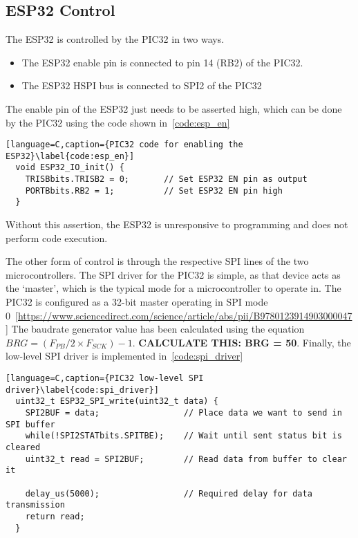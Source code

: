\subsection{ESP32 Control}
The ESP32 is controlled by the PIC32 in two ways.

\begin{itemize}
        \item The ESP32 enable pin is connected to pin 14 (RB2) of the PIC32.
        \item The ESP32 HSPI bus is connected to SPI2 of the PIC32
\end{itemize}

The enable pin of the ESP32 just needs to be asserted high, which can be done by the PIC32 using the code shown in~\autoref{code:esp_en}

\begin{lstlisting}[language=C,caption={PIC32 code for enabling the ESP32}\label{code:esp_en}]
  void ESP32_IO_init() {
    TRISBbits.TRISB2 = 0;       // Set ESP32 EN pin as output
    PORTBbits.RB2 = 1;          // Set ESP32 EN pin high
  }
\end{lstlisting}

Without this assertion, the ESP32 is unresponsive to programming and does not perform code execution.

The other form of control is through the respective SPI lines of the two microcontrollers.
The SPI driver for the PIC32 is simple, as that device acts as the `master', which is the typical mode for a microcontroller to operate in.
The PIC32 is configured as a 32-bit master operating in SPI mode 0~\ref{https://www.sciencedirect.com/science/article/abs/pii/B9780123914903000047}
The baudrate generator value has been calculated using the equation \(BRG = (F_{PB} / 2 \times F_{SCK}) - 1\). \textbf{CALCULATE THIS: BRG = 50}.
Finally, the low-level SPI driver is implemented in~\autoref{code:spi_driver}

\begin{lstlisting}[language=C,caption={PIC32 low-level SPI driver}\label{code:spi_driver}]
  uint32_t ESP32_SPI_write(uint32_t data) {
    SPI2BUF = data;                 // Place data we want to send in SPI buffer
    while(!SPI2STATbits.SPITBE);    // Wait until sent status bit is cleared
    uint32_t read = SPI2BUF;        // Read data from buffer to clear it

    delay_us(5000);                 // Required delay for data transmission
    return read;
  }
\end{lstlisting}

